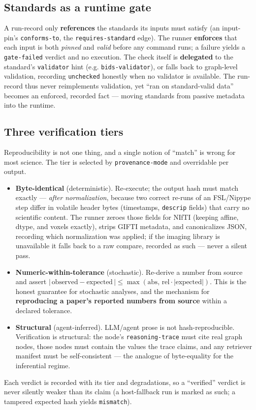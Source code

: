 \documentclass[preprint]{glimmer-paper}
\newcommand{\code}[1]{\texttt{#1}}
\begin{document}
\subsection{Standards as a runtime gate}
\label{sec:gate}
A run-record only \textbf{references} the standards its inputs must satisfy (an input-pin's
\code{conforms-to}, the \code{requires-standard} edge). The runner \textbf{enforces} that
each input is both \emph{pinned} and \emph{valid} before any command runs; a failure yields a
\code{gate-failed} verdict and no execution. The check itself is \textbf{delegated} to the
standard's \code{validator} hint (e.g. \code{bids-validator}), or falls back to graph-level
validation, recording \code{unchecked} honestly when no validator is available. The
run-record thus never reimplements validation, yet ``ran on standard-valid data'' becomes an
enforced, recorded fact --- moving standards from passive metadata into the runtime.

\subsection{Three verification tiers}
\label{sec:tiers}
Reproducibility is not one thing, and a single notion of ``match'' is wrong for most science.
The tier is selected by \code{provenance-mode} and overridable per output.
\begin{itemize}
\item \textbf{Byte-identical} (deterministic). Re-execute; the output hash must match exactly
  --- \emph{after normalization}, because two correct re-runs of an FSL/Nipype step differ in
  volatile header bytes (timestamps, \code{descrip} fields) that carry no scientific content.
  The runner zeroes those fields for NIfTI (keeping affine, dtype, and voxels exactly),
  strips GIFTI metadata, and canonicalizes JSON, recording which normalization was applied;
  if the imaging library is unavailable it falls back to a raw compare, recorded as such ---
  never a silent pass.
\item \textbf{Numeric-within-tolerance} (stochastic). Re-derive a number from source and
  assert $|\,\text{observed}-\text{expected}\,| \le \max(\text{abs},\,\text{rel}\cdot|\text{expected}|)$.
  This is the honest guarantee for stochastic analyses, and the mechanism for
  \textbf{reproducing a paper's reported numbers from source} within a declared tolerance.
\item \textbf{Structural} (agent-inferred). LLM/agent prose is not hash-reproducible.
  Verification is structural: the node's \code{reasoning-trace} must cite real graph nodes,
  those nodes must contain the values the trace claims, and any retriever manifest must be
  self-consistent --- the analogue of byte-equality for the inferential regime.
\end{itemize}
Each verdict is recorded with its tier and degradations, so a ``verified'' verdict is never
silently weaker than its claim (a host-fallback run is marked as such; a tampered expected
hash yields \code{mismatch}).
\end{document}
